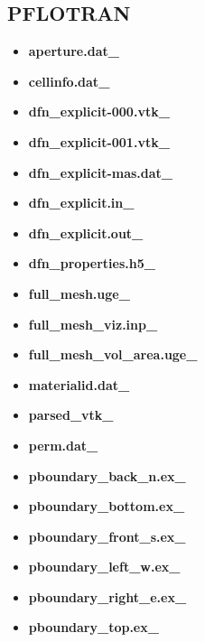 \documentclass[letterpaper,10pt,english]{sphinxmanual}
\begin{document}
\subsection{PFLOTRAN}
\label{output:pflotran}\begin{itemize}
\item {} 
{\color{red}\bfseries{}aperture.dat\_}

\item {} 
{\color{red}\bfseries{}cellinfo.dat\_}

\item {} 
{\color{red}\bfseries{}dfn\_explicit-000.vtk\_}

\item {} 
{\color{red}\bfseries{}dfn\_explicit-001.vtk\_}

\item {} 
{\color{red}\bfseries{}dfn\_explicit-mas.dat\_}

\item {} 
{\color{red}\bfseries{}dfn\_explicit.in\_}

\item {} 
{\color{red}\bfseries{}dfn\_explicit.out\_}

\item {} 
{\color{red}\bfseries{}dfn\_properties.h5\_}

\item {} 
{\color{red}\bfseries{}full\_mesh.uge\_}

\item {} 
{\color{red}\bfseries{}full\_mesh\_viz.inp\_}

\item {} 
{\color{red}\bfseries{}full\_mesh\_vol\_area.uge\_}

\item {} 
{\color{red}\bfseries{}materialid.dat\_}

\item {} 
{\color{red}\bfseries{}parsed\_vtk\_}

\item {} 
{\color{red}\bfseries{}perm.dat\_}

\item {} 
{\color{red}\bfseries{}pboundary\_back\_n.ex\_}

\item {} 
{\color{red}\bfseries{}pboundary\_bottom.ex\_}

\item {} 
{\color{red}\bfseries{}pboundary\_front\_s.ex\_}

\item {} 
{\color{red}\bfseries{}pboundary\_left\_w.ex\_}

\item {} 
{\color{red}\bfseries{}pboundary\_right\_e.ex\_}

\item {} 
{\color{red}\bfseries{}pboundary\_top.ex\_}

\end{itemize}
\end{document}
